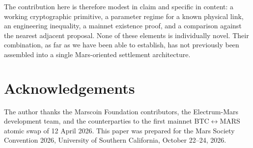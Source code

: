 \documentclass[11pt]{article}
\begin{document}
The contribution here is therefore modest in claim and specific in content: a working cryptographic primitive, a parameter regime for a known physical link, an engineering inequality, a mainnet existence proof, and a comparison against the nearest adjacent proposal. None of these elements is individually novel. Their combination, as far as we have been able to establish, has not previously been assembled into a single Mars-oriented settlement architecture.

\section*{Acknowledgements}
The author thanks the Marscoin Foundation contributors, the Electrum-Mars development team, and the counterparties to the first mainnet BTC$\leftrightarrow$MARS atomic swap of 12 April 2026. This paper was prepared for the Mars Society Convention 2026, University of Southern California, October 22--24, 2026.


\end{document}
